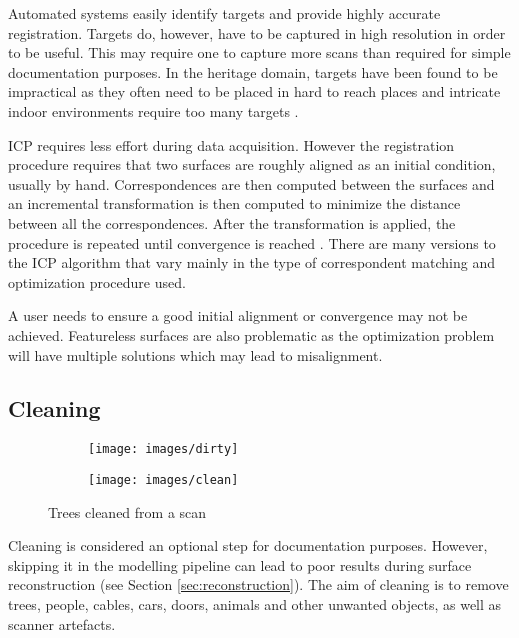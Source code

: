 Automated systems easily identify targets and provide highly accurate registration. Targets do, however, have to be captured in high resolution in order to be useful. This may require one to capture more scans than required for simple documentation purposes. In the heritage domain, targets have been found to be impractical as they often need to be placed in hard to reach places and intricate indoor environments require too many targets \cite{Ruther2011}.

ICP requires less effort during data acquisition. However the registration procedure requires that two surfaces are roughly aligned as an initial condition, usually by hand. Correspondences are then computed between the surfaces and an incremental transformation is then computed to minimize the distance between all the correspondences. After the transformation is applied, the procedure is repeated until convergence is reached \cite{Rusinkiewicz}. There are many versions to the ICP algorithm that vary mainly in the type of correspondent matching and optimization procedure used.

A user needs to ensure a good initial alignment or convergence may not be achieved. Featureless surfaces are also problematic as the optimization problem will have multiple solutions which may lead to misalignment.

\subsection{Cleaning}\label{sec:cleaning}

\begin{figure}[ht]
	\begin{subfigure}[b]{.5\textwidth}
	  \centering
	  \texttt{[image: images/dirty]}
	\end{subfigure}%
	\begin{subfigure}[b]{.5\textwidth}
	  \centering
	  \texttt{[image: images/clean]}
	\end{subfigure}
  \caption{Trees cleaned from a scan}
  \label{fig:cleaning}
\end{figure}

Cleaning is considered an optional step for documentation purposes. However, skipping it in the modelling pipeline can lead to poor results during surface reconstruction (see Section \ref{sec:reconstruction}). The aim of cleaning is to remove trees, people, cables, cars, doors, animals and other unwanted objects, as well as scanner artefacts.

